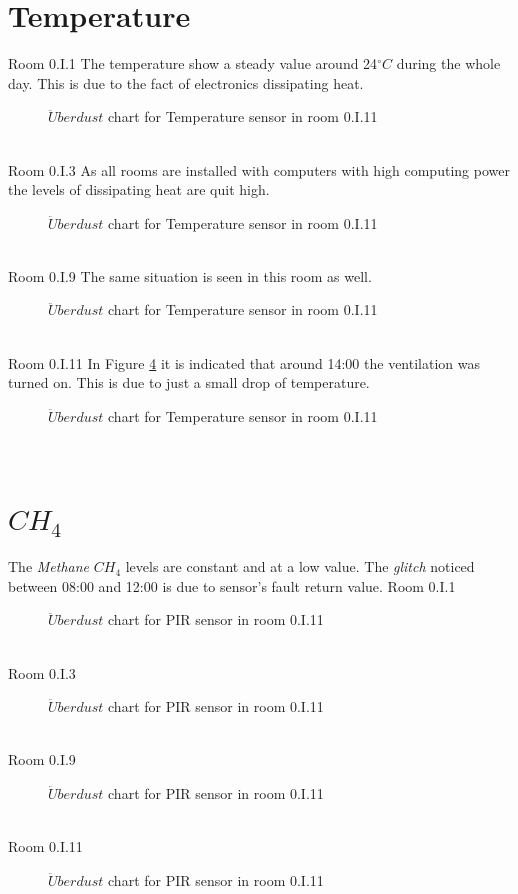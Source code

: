 \documentclass[12pt,a4paper]{report}
\begin{document}
\section{Temperature}
%
{Room 0.I.1}
%
The temperature show a steady value around 24$^\circ C$ during the whole day. This is due to the fact of electronics dissipating heat.
\begin{figure}[H]
\centering
\caption{$\ddot{U}berdust$ chart for Temperature sensor in room 0.I.11}
\label{chart_temp_1}
\end{figure}
\ \\
%
{Room 0.I.3}
%
As all rooms are installed with computers with high computing power the levels of dissipating heat are quit high.
\begin{figure}[H]
\centering
\caption{$\ddot{U}berdust$ chart for Temperature sensor in room 0.I.11}
\label{chart_temp_3}
\end{figure}
\ \\
%
{Room 0.I.9}
%
The same situation is seen in this room as well.
\begin{figure}[H]
\centering
\caption{$\ddot{U}berdust$ chart for Temperature sensor in room 0.I.11}
\label{chart_temp_9}
\end{figure}
\ \\
%
{Room 0.I.11}
%
In Figure \ref{chart_temp_11} it is indicated that around 14:00 the ventilation was turned on. This is due to just a small drop of temperature.
\begin{figure}[H]
\centering
\caption{$\ddot{U}berdust$ chart for Temperature sensor in room 0.I.11}
\label{chart_temp_11}
\end{figure}
\ \\
%
\section{$CH_4$}
%
The \textit{Methane} $CH_4$ levels are constant and at a low value. The \textit{glitch} noticed between 08:00 and 12:00 is due to sensor's fault return value.
{Room 0.I.1}
%
\begin{figure}[H]
\centering
\caption{$\ddot{U}berdust$ chart for PIR sensor in room 0.I.11}
\label{chart_ch4_1}
\end{figure}
\ \\
%
{Room 0.I.3}
%
\begin{figure}[H]
\centering
\caption{$\ddot{U}berdust$ chart for PIR sensor in room 0.I.11}
\label{chart_ch4_3}
\end{figure}
\ \\
%
{Room 0.I.9}
%
\begin{figure}[H]
\centering
\caption{$\ddot{U}berdust$ chart for PIR sensor in room 0.I.11}
\label{chart_ch4_9}
\end{figure}
\ \\
%
{Room 0.I.11}
%
\begin{figure}[H]
\centering
\caption{$\ddot{U}berdust$ chart for PIR sensor in room 0.I.11}
\label{chart_ch4_11}
\end{figure}
\ \\
%
\end{document}
